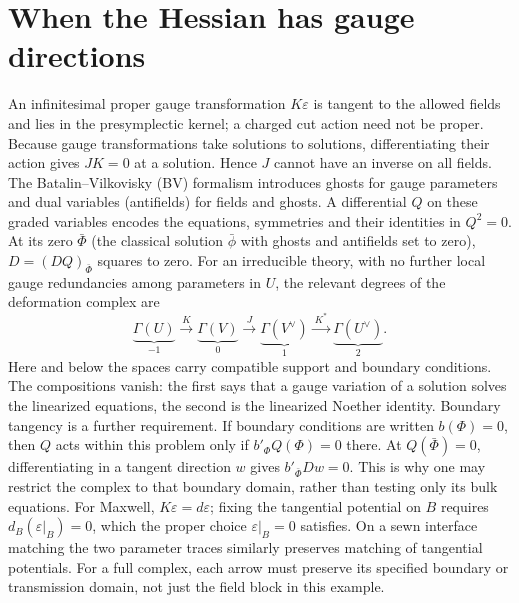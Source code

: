 \section{When the Hessian has gauge directions}
An infinitesimal proper gauge transformation $K\varepsilon$ is tangent to the
allowed fields and lies in the presymplectic kernel; a charged cut action
need not be proper. Because gauge transformations take solutions to solutions,
differentiating their action gives $JK=0$ at a solution. Hence $J$ cannot
have an inverse on all fields. The Batalin--Vilkovisky (BV) formalism
\cite{CMR} introduces ghosts for gauge parameters and dual variables
(antifields) for fields and ghosts. A differential $Q$ on these graded
variables encodes the equations, symmetries and their identities in
$Q^2=0$. At its zero $\bar\Phi$ (the classical solution $\bar\phi$ with
ghosts and antifields set to zero), $D=(DQ)_{\bar\Phi}$ squares to zero.
For an irreducible theory, with no further local gauge redundancies among
parameters in $U$, the relevant degrees of the deformation complex are
\[
 \underbrace{\Gamma(U)}_{-1}\xrightarrow{\ K\ }
 \underbrace{\Gamma(V)}_{0}\xrightarrow{\ J\ }
 \underbrace{\Gamma(V^\vee)}_{1}\xrightarrow{\ K^*\ }
 \underbrace{\Gamma(U^\vee)}_{2}.
\]
Here and below the spaces carry compatible support and boundary conditions.
The compositions vanish: the first says that a gauge variation of a solution
solves the linearized equations, the second is the linearized Noether
identity. Boundary tangency is a further requirement. If boundary conditions
are written $b(\Phi)=0$, then $Q$ acts within this problem only if
$b'_\Phi Q(\Phi)=0$ there. At $Q(\bar\Phi)=0$, differentiating in a tangent
direction $w$ gives $b'_{\bar\Phi}Dw=0$. This is why one may restrict the
complex to that boundary domain, rather than testing only its bulk equations.
For Maxwell, $K\varepsilon=d\varepsilon$; fixing the tangential potential on $B$ requires
$d_B(\varepsilon|_B)=0$, which the proper choice $\varepsilon|_B=0$ satisfies.
On a sewn interface matching the two parameter traces similarly preserves
matching of tangential potentials. For a full complex, each arrow must
preserve its specified boundary or transmission domain, not just the field
block in this example.

